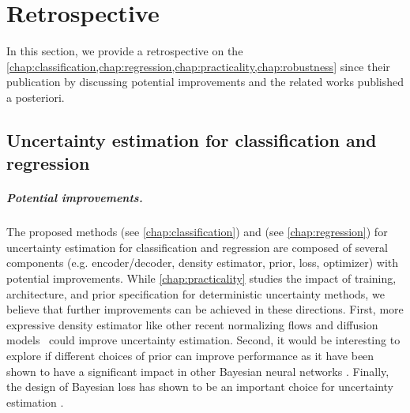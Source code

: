 \chapter{Retrospective}
\label{chap:retrospective_1}


In this section, we provide a retrospective on the \cref{chap:classification,chap:regression,chap:practicality,chap:robustness} since their publication by discussing potential improvements and the related works published a posteriori.

\section{Uncertainty estimation for classification and regression} 

\paragraph{Potential improvements.} The proposed methods \PostNetacro{} (see \cref{chap:classification}) and \NatPNacro{} (see \cref{chap:regression}) for uncertainty estimation for classification and regression are composed of several components (e.g. encoder/decoder, density estimator, prior, loss, optimizer) with potential improvements. While \cref{chap:practicality} studies the impact of training, architecture, and prior specification for deterministic uncertainty methods, we believe that further improvements can be achieved in these directions. First, more expressive density estimator like other recent normalizing flows \cite{nf-review} and diffusion models \cite{variationaldiffussion2022kingma} could improve uncertainty estimation. Second, it would be interesting to explore if different choices of prior can improve performance as it have been shown to have a significant impact in other Bayesian neural networks \cite{bayesposterior2020wenzel, coldaleatoric2020adlam}. Finally, the design of Bayesian loss has shown to be an important choice for uncertainty estimation \cite{bengs2022pitfalls, bengs2023secondorder}.

